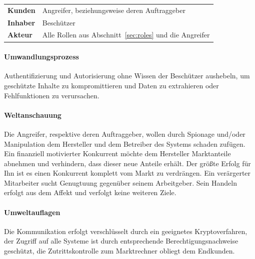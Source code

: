 \documentclass[11pt,a4paper]{report}
\begin{document}
\begin{table}[h] %
\begin{tabularx}{\linewidth}{@{}lX@{}}
\textbf{Kunden} & Angreifer, beziehungsweise deren Auftraggeber\\
\textbf{Inhaber} & Beschützer\\
\textbf{Akteur} & Alle Rollen aus Abschnitt~\ref{sec:roles} und die Angreifer\\
\end{tabularx}
\end{table}

\paragraph{Umwandlungsprozess} Authentifizierung und Autorisierung ohne Wissen der Beschützer aushebeln, um geschützte Inhalte zu kompromittieren und Daten zu extrahieren oder Fehlfunktionen zu verursachen.

\paragraph{Weltanschauung} Die Angreifer, respektive deren Auftraggeber, wollen durch Spionage und/oder Manipulation dem Hersteller und dem
Betreiber des Systems schaden zufügen. Ein finanziell motivierter Konkurrent möchte dem Hersteller Marktanteile abnehmen und verhindern, dass dieser neue Anteile erhält. Der größte Erfolg für Ihn ist es einen Konkurrent komplett vom Markt zu verdrängen. Ein verärgerter Mitarbeiter sucht Genugtuung gegenüber seinem Arbeitgeber. Sein Handeln erfolgt aus dem Affekt und verfolgt keine weiteren Ziele.

\paragraph{Umweltauflagen} Die Kommunikation erfolgt verschlüsselt durch ein geeignetes Kryptoverfahren, der Zugriff auf alle Systeme ist durch entsprechende Berechtigungsnachweise geschützt, die Zutrittskontrolle zum Marktrechner obliegt dem Endkunden.
\end{document}
